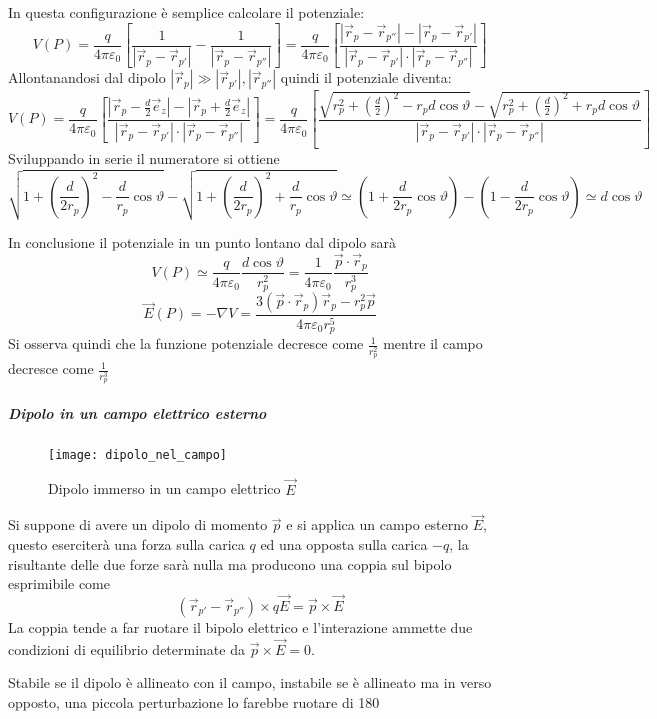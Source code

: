 In questa configurazione è semplice calcolare il potenziale:
$$
V(P) = \frac{q}{4\pi\varepsilon_0}\left[ \frac{1}{|\vec{r}_p-\vec{r}_{p'}|} - \frac{1}{|\vec{r}_p-\vec{r}_{p''}|} \right] = 
\frac{q}{4\pi\varepsilon_0} \left[ \frac{|\vec{r}_p-\vec{r}_{p''}|-|\vec{r}_p-\vec{r}_{p'}|}
{|\vec{r}_p-\vec{r}_{p'}|\cdot|\vec{r}_p-\vec{r}_{p''}|} \right]
$$
Allontanandosi dal dipolo $|\vec{r}_p| \gg |\vec{r}_{p'}|,|\vec{r}_{p''}|$ quindi il potenziale
diventa:
$$
V(P) = \frac{q}{4\pi\varepsilon_0} \left[ \frac{|\vec{r}_p-\frac{d}{2}\vec{e}_z|-|\vec{r}_p + \frac{d}{2}\vec{e}_z|}
{|\vec{r}_p-\vec{r}_{p'}|\cdot|\vec{r}_p-\vec{r}_{p''}|} \right] = 
\frac{q}{4\pi\varepsilon_0} \left[ \frac{\sqrt{r_p^2 + \left(\frac{d}{2}\right)^2-r_p d \cos \vartheta} - \sqrt{r_p^2 + \left(\frac{d}{2}\right)^2 + r_p d \cos \vartheta}}
{|\vec{r}_p-\vec{r}_{p'}|\cdot|\vec{r}_p-\vec{r}_{p''}|} \right] 
$$
Sviluppando in serie il numeratore si ottiene
$$
 \sqrt{1 + \left(\frac{d}{2r_p}\right)^2- 
\frac{d}{r_p} \cos \vartheta} - \sqrt{1 + \left(\frac{d}{2r_p}\right)^2 + \frac{d}{r_p} \cos \vartheta} \simeq %
\left(1 + \frac{d}{2r_p} \cos \vartheta\right) - \left(1 - \frac{d}{2r_p} \cos \vartheta\right)
\simeq d\cos\vartheta
$$

In conclusione il potenziale in un punto lontano dal dipolo sarà
$$
V(P) \simeq \frac{q}{4\pi\varepsilon_0} \frac{d\cos\vartheta}{r_p^2} = \frac{1}{4\pi\varepsilon_0}
\frac{\vec{p}\cdot\vec{r}_p}{r_p^3}
$$
$$
\vec{E}(P) = -\nabla V = \frac{3\left(\vec{p}\cdot\vec{r}_p\right)\vec{r}_p - r_p^2\vec{p}}{4\pi\varepsilon_0r_p^5}
$$
Si osserva quindi che la funzione potenziale decresce come $\frac{1}{r_p^2}$ mentre il 
campo decresce come $\frac{1}{r_p^3}$

\subparagraph{Dipolo in un campo elettrico esterno}
\begin{figure}[H]
\centering
\texttt{[image: dipolo\_nel\_campo]}
\caption{Dipolo immerso in un campo elettrico $\vec{E}$}
\end{figure}
Si suppone di avere un dipolo di momento $\vec{p}$ e si applica un campo esterno $\vec{E}$,
questo eserciterà una forza sulla carica $q$ ed una opposta sulla carica $-q$, la risultante delle 
due forze sarà nulla ma producono una coppia sul bipolo esprimibile come
$$
\left(\vec{r}_{p'} - \vec{r}_{p''}\right)\times q\vec{E} = \vec{p}\times\vec{E}
$$
La coppia tende a far ruotare il bipolo elettrico e l'interazione ammette due condizioni di 
equilibrio determinate da $\vec{p}\times\vec{E} = 0 $.

Stabile se il dipolo è allineato con il campo, instabile se è allineato ma in verso opposto,
una piccola perturbazione lo farebbe ruotare di 180\textdegree

